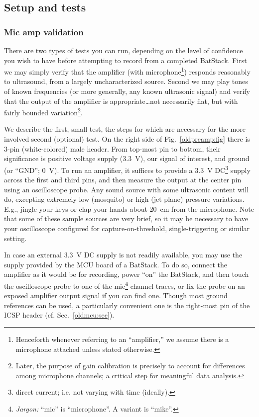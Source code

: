 \documentclass[letterpaper]{article}
\begin{document}
\subsection{Setup and tests}
\label{setup:sec}

\subsubsection{Mic amp validation}

There are two types of tests you can run, depending on the level of
confidence you wish to have before attempting to record from a
completed BatStack. First we may simply verify that the amplifier
(with microphone\footnote{Henceforth whenever referring to an
  ``amplifier,'' we assume there is a microphone attached unless
  stated otherwise.}) responds reasonably to ultrasound, from a
largely uncharacterized source. Second we may play tones of known
frequencies (or more generally, any known ultrasonic signal) and
verify that the output of the amplifier is appropriate\ldots not
necessarily flat, but with fairly bounded variation\footnote{Later,
  the purpose of gain calibration is precisely to account for
  differences among microphone channels; a critical step for
  meaningful data analysis.}.

We describe the first, small test, the steps for which are necessary
for the more involved second (optional) test. On the right side of
Fig.~\ref{oldpreamp:fig} there is 3-pin (white-colored) male
header. From top-most pin to bottom, their significance is positive
voltage supply (3.3~V), our signal of interest, and ground (or
``GND''; 0~V). To run an amplifier, it suffices to provide a 3.3~V
DC\footnote{direct current; i.e. not varying with time (ideally).}
supply across the first and third pins, and then measure the output at
the center pin using an oscilloscope probe. Any sound source with some
ultrasonic content will do, excepting extremely low (mosquito) or high
(jet plane) pressure variations. E.g., jingle your keys or clap your
hands about 20~cm from the microphone. Note that some of these sample
sources are very brief, so it may be necessary to have your
oscilloscope configured for capture-on-threshold, single-triggering or
similar setting.

In case an external 3.3~V DC supply is not readily available, you may
use the supply provided by the MCU board of a BatStack. To do so,
connect the amplifier as it would be for recording, power ``on'' the
BatStack, and then touch the oscilloscope probe to one of the
mic\footnote{\textit{Jargon:} ``mic'' is ``microphone''. A variant is
  ``mike''.} channel traces, or fix the probe on an exposed amplifier
output signal if you can find one. Though most ground references can
be used, a particularly convenient one is the right-most pin of the
ICSP header (cf. Sec.~\ref{oldmcu:sec}).
\end{document}
